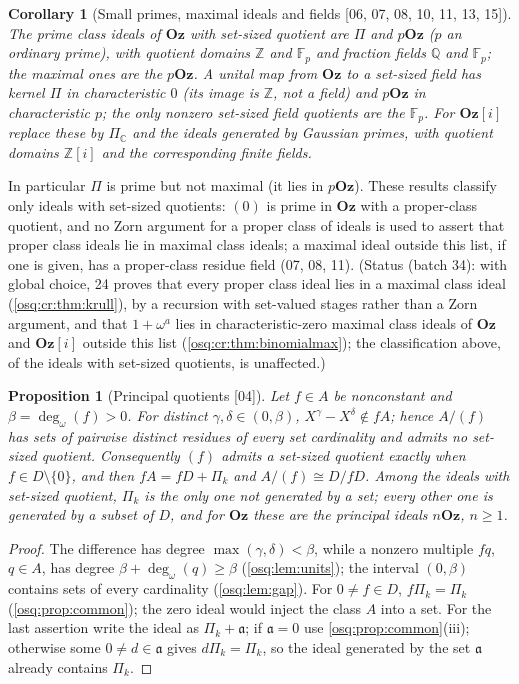 \documentclass[11pt,letterpaper]{article}
\numberwithin{equation}{section}
\newtheorem{proposition}[proposition]{Proposition}
\newtheorem{corollary}[corollary]{Corollary}
\theoremstyle{definition}
\theoremstyle{remark}
\theoremstyle{plain}
\newcommand{\Oz}{\mathbf{Oz}}
\newcommand{\GOz}{\Oz[i]}
\newcommand{\Z}{\mathbb Z}
\newcommand{\Q}{\mathbb Q}
\newcommand{\C}{\mathbb C}
\newcommand{\F}{\mathbb F}
\newcommand{\degw}{\deg_{\omega}}
\newcommand{\src}[1]{\textup{\textsf{[#1]}}}
\begin{document}
\begin{corollary}[Small primes, maximal ideals and fields \src{06, 07, 08, 10, 11, 13, 15}]\label{osq:cor:smallprimes}
The prime class ideals of $\Oz$ with set-sized quotient are $\Pi$ and $p\Oz$ ($p$ an
ordinary prime), with quotient domains $\Z$ and $\F_p$ and fraction fields $\Q$ and $\F_p$;
the maximal ones are the $p\Oz$. A unital map from $\Oz$ to a set-sized field has kernel
$\Pi$ in characteristic $0$ (its image is $\Z$, not a field) and $p\Oz$ in characteristic
$p$; the only nonzero set-sized field quotients are the $\F_p$. For $\GOz$ replace these by
$\Pi_\C$ and the ideals generated by Gaussian primes, with quotient domains $\Z[i]$ and the
corresponding finite fields.
\end{corollary}

In particular $\Pi$ is prime but not maximal (it lies in $p\Oz$). These results classify
only ideals with set-sized quotients: $(0)$ is prime in $\Oz$ with a proper-class quotient,
and no Zorn argument for a proper class of ideals is used to assert that proper class
ideals lie in maximal class ideals; a maximal ideal outside this list, if one is given,
has a proper-class residue field (07, 08, 11). (Status (batch 34): with global choice, 24 proves that every proper class ideal
lies in a maximal class ideal (\cref{osq:cr:thm:krull}), by a recursion with set-valued stages rather than a Zorn argument, and
that $1+\omega^a$ lies in characteristic-zero maximal class ideals of $\Oz$ and $\GOz$ outside this list (\cref{osq:cr:thm:binomialmax}); the
classification above, of the ideals with set-sized quotients, is unaffected.)

\begin{proposition}[Principal quotients \src{04}]\label{osq:prop:principal}
Let $f\in A$ be nonconstant and $\beta=\degw(f)>0$. For distinct $\gamma,\delta\in(0,\beta)$,
$X^\gamma-X^\delta\notin fA$; hence $A/(f)$ has sets of pairwise distinct residues of every
set cardinality and admits no set-sized quotient. Consequently $(f)$ admits a set-sized
quotient exactly when $f\in D\setminus\{0\}$, and then $fA=fD+\Pi_k$ and
$A/(f)\cong D/fD$. Among the ideals with set-sized quotient, $\Pi_k$ is the only one not
generated by a set; every other one is generated by a subset of $D$, and for $\Oz$ these are
the principal ideals $n\Oz$, $n\ge1$.
\end{proposition}
\begin{proof}
The difference has degree $\max(\gamma,\delta)<\beta$, while a nonzero multiple $fq$,
$q\in A$, has degree $\beta+\degw(q)\ge\beta$ (\cref{osq:lem:units}); the interval
$(0,\beta)$ contains sets of every cardinality (\cref{osq:lem:gap}). For $0\ne f\in D$,
$f\Pi_k=\Pi_k$ (\cref{osq:prop:common}); the zero ideal would inject the class $A$ into a
set. For the last assertion write the ideal as $\Pi_k+\mathfrak a$; if
$\mathfrak a=0$ use \cref{osq:prop:common}(iii); otherwise some $0\ne d\in\mathfrak a$ gives
$d\Pi_k=\Pi_k$, so the ideal generated by the set $\mathfrak a$ already contains $\Pi_k$.
\end{proof}
\end{document}
